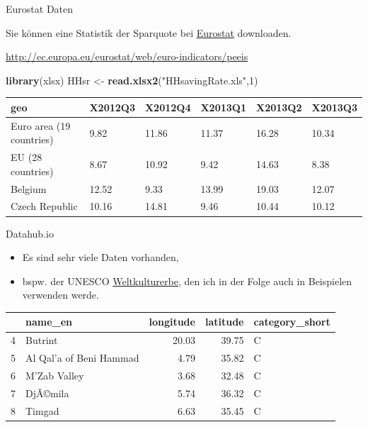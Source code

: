 \documentclass[ignorenonframetext,]{beamer}
\newenvironment{Shaded}{\begin{snugshade}}{\end{snugshade}}
\newcommand{\DecValTok}[1]{\textcolor[rgb]{0.00,0.00,0.81}{#1}}
\newcommand{\KeywordTok}[1]{\textcolor[rgb]{0.13,0.29,0.53}{\textbf{#1}}}
\newcommand{\NormalTok}[1]{#1}
\newcommand{\StringTok}[1]{\textcolor[rgb]{0.31,0.60,0.02}{#1}}
\providecommand{\tightlist}{%
  \setlength{\itemsep}{0pt}\setlength{\parskip}{0pt}}
\begin{document}
\begin{frame}[fragile]{Eurostat Daten}
\protect\hypertarget{eurostat-daten}{}

Sie können eine Statistik der Sparquote bei
\href{http://ec.europa.eu/eurostat/web/euro-indicators/peeis}{Eurostat}
downloaden.

\url{http://ec.europa.eu/eurostat/web/euro-indicators/peeis}

\begin{Shaded}
\begin{Highlighting}[]
\KeywordTok{library}\NormalTok{(xlsx)}
\NormalTok{HHsr <-}\StringTok{ }\KeywordTok{read.xlsx2}\NormalTok{(}\StringTok{"HHsavingRate.xls"}\NormalTok{,}\DecValTok{1}\NormalTok{)}
\end{Highlighting}
\end{Shaded}

\begin{longtable}[]{@{}llllll@{}}
\toprule
geo & X2012Q3 & X2012Q4 & X2013Q1 & X2013Q2 & X2013Q3\tabularnewline
\midrule
\endhead
Euro area (19 countries) & 9.82 & 11.86 & 11.37 & 16.28 &
10.34\tabularnewline
EU (28 countries) & 8.67 & 10.92 & 9.42 & 14.63 & 8.38\tabularnewline
Belgium & 12.52 & 9.33 & 13.99 & 19.03 & 12.07\tabularnewline
Czech Republic & 10.16 & 14.81 & 9.46 & 10.44 & 10.12\tabularnewline
\bottomrule
\end{longtable}

\end{frame}

\begin{frame}{Datahub.io}
\protect\hypertarget{datahub.io}{}

\begin{itemize}
\tightlist
\item
  Es sind sehr viele Daten vorhanden,
\item
  bspw. der UNESCO
  \href{http://datahub.io/dataset/unesco-world-heritage-sites/resource/d4116195-44d8-4bc1-9f91-9b570870dc19}{Weltkulturerbe},
  den ich in der Folge auch in Beispielen verwenden werde.
\end{itemize}

\begin{longtable}[]{@{}llrrl@{}}
\toprule
& name\_en & longitude & latitude & category\_short\tabularnewline
\midrule
\endhead
4 & Butrint & 20.03 & 39.75 & C\tabularnewline
5 & Al Qal'a of Beni Hammad & 4.79 & 35.82 & C\tabularnewline
6 & M'Zab Valley & 3.68 & 32.48 & C\tabularnewline
7 & DjÃ©mila & 5.74 & 36.32 & C\tabularnewline
8 & Timgad & 6.63 & 35.45 & C\tabularnewline
\bottomrule
\end{longtable}

\end{frame}
\end{document}

